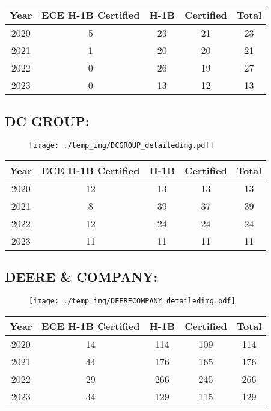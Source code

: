 \documentclass{article}%
\begin{document}
%
\begin{longtable}{c|c|c|c|c}%
\hline%
Year&ECE H{-}1B Certified&H{-}1B&Certified&Total\\%
\hline%
2020&5&23&21&23\\%
\hline%
2021&1&20&20&21\\%
\hline%
2022&0&26&19&27\\%
\hline%
2023&0&13&12&13\\%
\hline%
\end{longtable}

%
\newpage%
\subsection{DC GROUP:}%
\label{subsec:DCGROUP}%
\label{DCGROUPdetailed}%


\begin{figure}[htbp]%
\centering%
\texttt{[image: ./temp\_img/DCGROUP\_detailedimg.pdf]}%
\end{figure}

%
\begin{longtable}{c|c|c|c|c}%
\hline%
Year&ECE H{-}1B Certified&H{-}1B&Certified&Total\\%
\hline%
2020&12&13&13&13\\%
\hline%
2021&8&39&37&39\\%
\hline%
2022&12&24&24&24\\%
\hline%
2023&11&11&11&11\\%
\hline%
\end{longtable}

%
\newpage%
\subsection{DEERE \& COMPANY:}%
\label{subsec:DEERECOMPANY}%
\label{DEERECOMPANYdetailed}%


\begin{figure}[htbp]%
\centering%
\texttt{[image: ./temp\_img/DEERECOMPANY\_detailedimg.pdf]}%
\end{figure}

%
\begin{longtable}{c|c|c|c|c}%
\hline%
Year&ECE H{-}1B Certified&H{-}1B&Certified&Total\\%
\hline%
2020&14&114&109&114\\%
\hline%
2021&44&176&165&176\\%
\hline%
2022&29&266&245&266\\%
\hline%
2023&34&129&115&129\\%
\hline%
\end{longtable}
\end{document}
